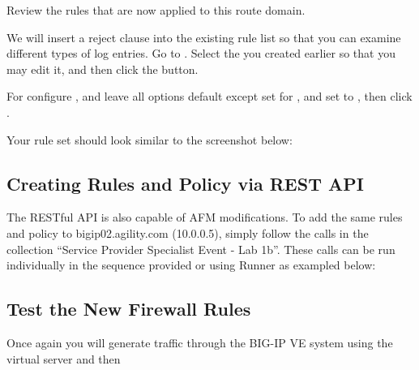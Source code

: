\documentclass[letterpaper,10pt,english]{sphinxmanual}
\begin{document}
Review the rules that are now applied to this route domain.


We will insert a reject clause into the existing rule list so that you
can examine different types of log entries. Go to . Select the  you created
earlier so that you may edit it, and then click the  button.


For  configure , and leave all options
default except set  for , and set 
to , then click .


Your rule set should look similar to the screenshot below:



\subsection{Creating Rules and Policy via REST API}
\label{\detokenize{class1/module1/lab4:creating-rules-and-policy-via-rest-api}}\label{\detokenize{class1/module1/lab4::doc}}
The RESTful API is also capable of AFM modifications. To add the same
rules and policy to bigip02.agility.com (10.0.0.5), simply follow the
calls in the collection “Service Provider Specialist Event - Lab 1b”.
These calls can be run individually in the sequence provided or using
Runner as exampled below:



\subsection{Test the New Firewall Rules}
\label{\detokenize{class1/module1/lab4:test-the-new-firewall-rules}}
Once again you will generate traffic through the BIG-IP VE system using
the  virtual server and then
\end{document}
